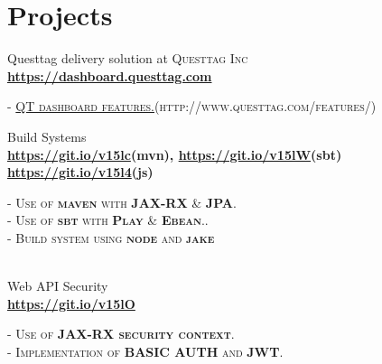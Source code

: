 \documentclass[10pt]{article} %
\begin{document}
{\begin{minipage}[t]{0.5\textwidth}

\section{Projects} 



{\raggedright\large Questtag delivery solution at \textsc{Questtag Inc}\\
\large\textbf{\href{https://dashboard.questtag.com}{https://dashboard.questtag.com}}\\[2pt]
}

\textsc{- \href{http://www.questtag.com/features/}{QT dashboard features.}(http://www.questtag.com/features/)}\\




{\raggedright\large Build Systems \\
	\textbf{\href {https://github.com/Bitaron/java-maven}{https://git.io/v15lc}(mvn), \href{https://github.com/Bitaron/java-sbt}{https://git.io/v15lW}(sbt)
		\href{https://github.com/Bitaron/js}{https://git.io/v15l4}(js)}\\[5pt]}
\textsc{- Use of \textbf{maven} with \textbf{JAX-RX} \& \textbf{JPA}. }\\
\textsc{- Use of \textbf{sbt} with \textbf{Play} \& \textbf{Ebean}..}\\
\textsc{- Build system using \textbf{node} and \textbf{jake}}\\
\normalsize{}\\





{\raggedright\large Web API Security \\
	\textbf{\href {https://github.com/Bitaron/java-maven/tree/security}{https://git.io/v15lO}}\\[5pt]}
\textsc{- Use of \textbf{JAX-RX security context}.}\\
\textsc{- Implementation of  \textbf{BASIC AUTH} and  \textbf{JWT}.}\\



\end{minipage}}
\end{document}
